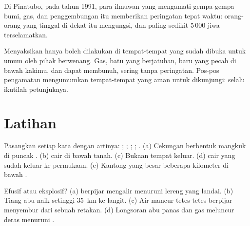 Di Pinatubo, pada tahun 1991, para ilmuwan yang mengamati gempa-gempa bumi,
gas, dan penggembungan  itu memberikan peringatan tepat waktu:
orang-orang yang tinggal di dekat  itu mengungsi, dan paling
sedikit 5\,000 jiwa terselamatkan.

\begin{remark}\label{rem:g7:volcanoes:safety}
Menyaksikan  hanya boleh dilakukan di tempat-tempat yang sudah
dibuka untuk umum oleh pihak berwenang. Gas, batu yang berjatuhan, 
 baru yang pecah di bawah kakimu, dan  dapat
membunuh, sering tanpa peringatan. Pos-pos pengamatan 
mengumumkan tempat-tempat yang aman untuk dikunjungi: selalu ikutilah
petunjuknya.
\end{remark}

\section{Latihan}

\begin{exercise}[$\star$]\label{exo:g7:volcanoes:1}
Pasangkan setiap kata dengan artinya: ; ; ; ; . (a) Cekungan berbentuk mangkuk di puncak .
(b)  cair di bawah tanah. (c) Bukaan tempat  keluar. (d) 
cair yang sudah keluar ke permukaan. (e) Kantong  yang besar beberapa
kilometer di bawah .
\end{exercise}

\begin{exercise}[$\star$]\label{exo:g7:volcanoes:2}
Efusif atau eksplosif? (a)   berpijar mengalir menuruni
lereng yang landai. (b) Tiang abu naik setinggi \qty{35}{km} ke langit.
(c) Air mancur tetes-tetes berpijar menyembur dari sebuah retakan.
(d) Longsoran abu panas dan gas meluncur deras menuruni .
\end{exercise}

